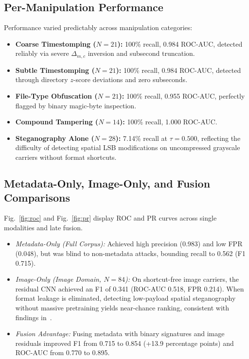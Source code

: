 \documentclass[conference]{IEEEtran}
\begin{document}
\subsection{Per-Manipulation Performance}
Performance varied predictably across manipulation categories:
\begin{itemize}
    \item \textbf{Coarse Timestomping ($N=21$):} 100\% recall, 0.984 ROC-AUC, detected reliably via severe $\Delta_{m,c}$ inversion and subsecond truncation.
    \item \textbf{Subtle Timestomping ($N=21$):} 100\% recall, 0.984 ROC-AUC, detected through directory $z$-score deviations and zero subseconds.
    \item \textbf{File-Type Obfuscation ($N=21$):} 100\% recall, 0.955 ROC-AUC, perfectly flagged by binary magic-byte inspection.
    \item \textbf{Compound Tampering ($N=14$):} 100\% recall, 1.000 ROC-AUC.
    \item \textbf{Steganography Alone ($N=28$):} 7.14\% recall at $\tau = 0.500$, reflecting the difficulty of detecting spatial LSB modifications on uncompressed grayscale carriers without format shortcuts.
\end{itemize}

\subsection{Metadata-Only, Image-Only, and Fusion Comparisons}
Fig.~\ref{fig:roc} and Fig.~\ref{fig:pr} display ROC and PR curves across single modalities and late fusion.
\begin{itemize}
    \item \textit{Metadata-Only (Full Corpus):} Achieved high precision (0.983) and low FPR (0.048), but was blind to non-metadata attacks, bounding recall to 0.562 (F1 0.715).
    \item \textit{Image-Only (Image Domain, $N=84$):} On shortcut-free image carriers, the residual CNN achieved an F1 of 0.341 (ROC-AUC 0.518, FPR 0.214). When format leakage is eliminated, detecting low-payload spatial steganography without massive pretraining yields near-chance ranking, consistent with findings in~\cite{fridrich2012rich, cogranne2020alaska}.
    \item \textit{Fusion Advantage:} Fusing metadata with binary signatures and image residuals improved F1 from 0.715 to 0.854 (+13.9 percentage points) and ROC-AUC from 0.770 to 0.895.
\end{itemize}
\end{document}
